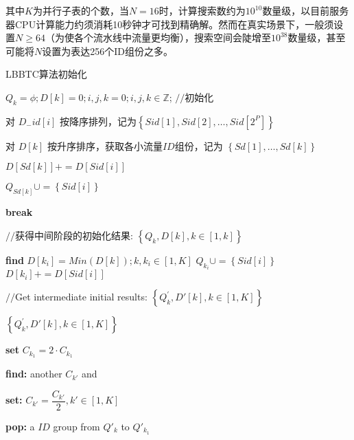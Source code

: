 其中$K$为并行子表的个数，当$N=16$时，计算搜索数约为$10^10$数量级，以目前服务器CPU计算能力约须消耗10秒钟才可找到精确解。然而在真实场景下，一般须设置$N\geq 64$（为使各个流水线中流量更均衡），搜索空间会陡增至$10^{38}$数量级，甚至可能将$N$设置为表达256个ID组份之多。

\begin{algorithm}[!h]
	\caption{LBBTC算法初始化  \label{lbbtcinit}}
	\IncMargin{2em}
	\DontPrintSemicolon

	
	$Q_k = \phi; D[k]=0;i,j,k=0;i,j,k \in \mathbb{Z}$; $//$初始化
	
	对 $D_{-}id[i]$ 按降序排列，记为$\left\{ Sid\left[ 1\right] ,Sid\left[ 2\right] ,\ldots ,Sid\left[ 2^{P}\right] \right\} $\;
	
	{
		{
			对 $D[k]$ 按升序排序，获取各小流量$ID$组份，记为 $\left\{ Sd\left[ 1\right] ,\ldots ,Sd\left[ k\right] \right\} $\;
			
			{
				{
					$D\left[ Sd\left[ k\right] \right] +=D\left[ Sid\left[ i\right] \right] $\;
					
					$Q_{Sd\left[ k\right]} \cup =\left\{ Sid\left[ i\right] \right\} $\;
					
					\textbf{break}\;
				}
			}
		}
	}

$//$获得中间阶段的初始化结果: $\left\{ Q_{k},D\left[ k\right] ,k\in \left[ 1,k\right] \right\} $\;




{
	\textbf{find} $D\left[ k_{i}\right] =Min\left( D\left[ k\right] \right) ;k,k_{i}\in \left[ 1,K\right] $\;
	$Q_{k_i}\cup =\left\{ Sid\left[ i\right] \right\} $\;
	$ D\left[ k_{i}\right] +=D\left[ Sid\left[ i\right] \right] $\;
}

$//$Get intermediate initial results: $\left\{ Q^{'}_{k},D'\left[ k\right] ,k\in \left[ 1,K\right] \right\} $\;

{
	\Return $\left\{ Q^{'}_{k},D'\left[ k\right] ,k\in \left[ 1,K\right] \right\} $\;
}
{
	\textbf{set} $ C_{k_{1}}=2 \cdot C_{k_{1}}$\;
	{
		\textbf{find:} another $C_{k'}$ and 
		
		\textbf{set:} $C_{k'}=\dfrac{C_{k'}}{2},k'\in [1,K]$\; 
	}
	
	{
		\textbf{pop:} a $ID$ group from $Q'_{k}$ to  $Q'_{k_1}$\;
	}
}

\end{algorithm}

